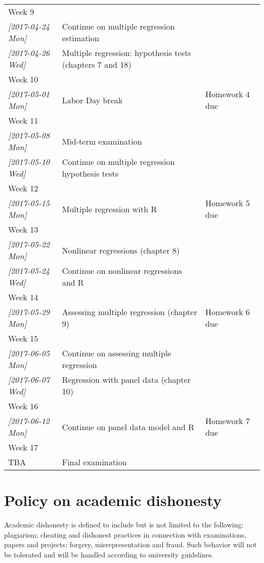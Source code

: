 \documentclass[a4paper,11pt]{article}
\begin{document}
{\begin{longtable}{p{2.8cm}p{9cm}p{3cm}}
\hline
Week 9 &  & \\
\textit{[2017-04-24 Mon]} & Continue on multiple regression estimation & \\
\textit{[2017-04-26 Wed]} & Multiple regression: hypothesis tests (chapters 7 and 18) & \\
\hline
Week 10 &  & \\
\textit{[2017-05-01 Mon]} & Labor Day break & Homework 4 due\\
\hline
Week 11 &  & \\
\textit{[2017-05-08 Mon]} & Mid-term examination & \\
\textit{[2017-05-10 Wed]} & Continue on multiple regression hypothesis tests & \\
\hline
Week 12 &  & \\
\textit{[2017-05-15 Mon]} & Multiple regression with R & Homework 5 due\\
\hline
Week 13 &  & \\
\textit{[2017-05-22 Mon]} & Nonlinear regressions (chapter 8) & \\
\textit{[2017-05-24 Wed]} & Continue on nonlinear regressions and R & \\
\hline
Week 14 &  & \\
\textit{[2017-05-29 Mon]} & Assessing multiple regression (chapter 9) & Homework 6 due\\
\hline
Week 15 &  & \\
\textit{[2017-06-05 Mon]} & Continue on assessing multiple regression & \\
\textit{[2017-06-07 Wed]} & Regression with panel data (chapter 10) & \\
\hline
Week 16 &  & \\
\textit{[2017-06-12 Mon]} & Continue on panel data model and R & Homework 7 due\\
\hline
Week 17 &  & \\
TBA & Final examination & \\
\hline
\end{longtable}
}


\section{Policy on academic dishonesty}
\label{sec:orga93f11d}

Academic dishonesty is defined to include but is not limited to the
following: plagiarism; cheating and dishonest practices in connection
with examinations, papers and projects; forgery, misrepresentation and
fraud. Such behavior will not be tolerated and will be handled
according to university guidelines.
\end{document}
